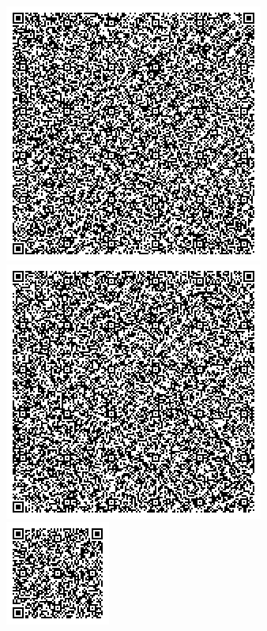 \documentclass[12pt]{article}   %
\begin{document}
\clearpage\thispagestyle{empty}

\begin{center}
\includegraphics[width=.4\textwidth]{qr_tmp/db_qr_0.png}\\\includegraphics[width=.4\textwidth]{qr_tmp/db_qr_1.png}\\\includegraphics[width=.4\textwidth]{qr_tmp/db_qr_2.png}\\
\end{center}

%
%
%

%
\end{document}
